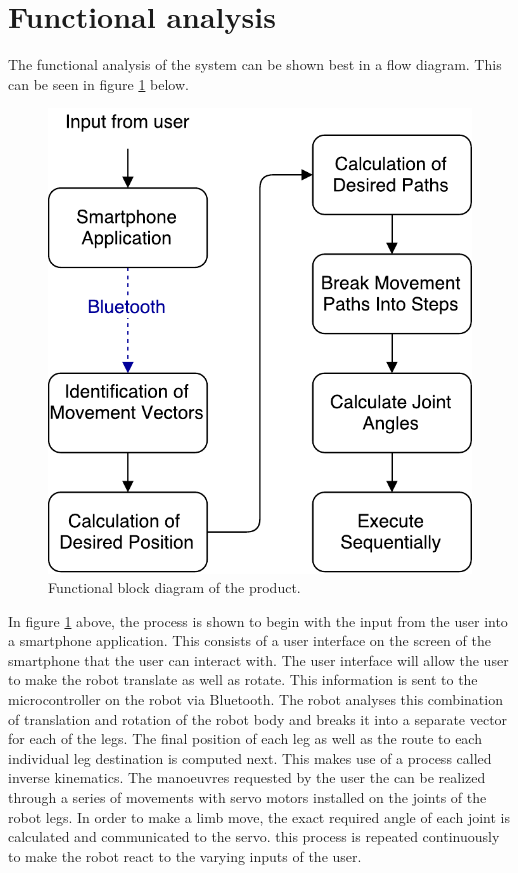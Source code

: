 
\section{Functional analysis}
The functional analysis of the system can be shown best in a flow diagram. This can be seen in figure \ref{fig:Func} below.

\begin{figure}[H]
\centering
\includegraphics[scale=0.8]{FunctionalDiagram.pdf}
\caption{Functional block diagram of the product.}
\label{fig:Func}
\end{figure}

In figure \ref{fig:Func} above, the process is shown to begin with the input from the user into a smartphone application. This consists of a user interface on the screen of the smartphone that the user can interact with. The user interface will allow the user to make the robot translate as well as rotate. This information is sent to the microcontroller on the robot via Bluetooth.
The robot analyses this combination of translation and rotation of the robot body and breaks it into a separate vector for each of the legs. The final position of each leg as well as the route to each individual leg destination is computed next. This makes use of a process called inverse kinematics. The manoeuvres requested by the user the can be realized through a series of movements with servo motors installed on the joints of the robot legs. In order to make a limb move, the exact required angle of each joint is calculated and communicated to the servo. this process is repeated continuously to make the robot react to the varying inputs of the user.

\newpage


